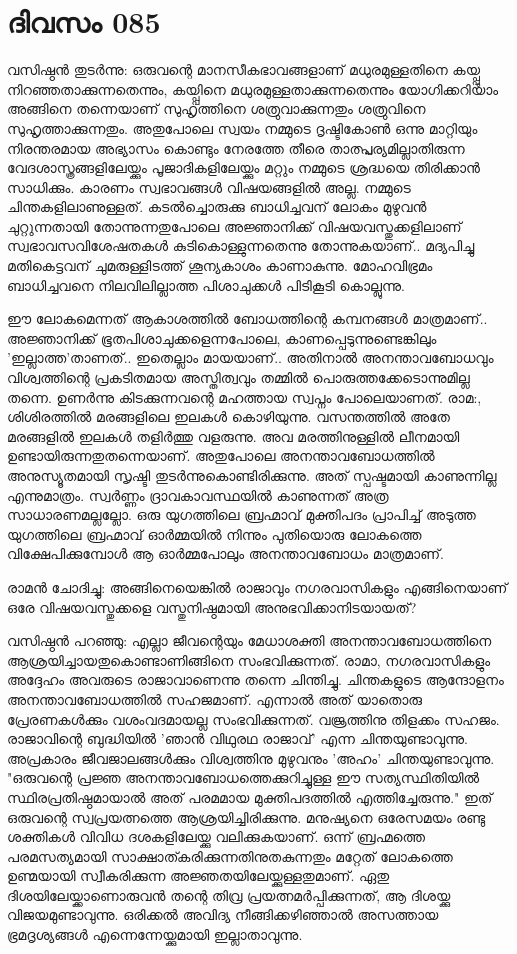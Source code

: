 \newpage
\section{ദിവസം 085}


വസിഷ്ഠന്‍ തുടര്‍ന്നു: ഒരുവന്റെ മാനസീകഭാവങ്ങളാണ്‌ മധുരമുള്ളതിനെ കയ്പ്പു നിറഞ്ഞതാക്കുന്നതെന്നും, കയ്പ്പിനെ മധുരമുള്ളതാക്കുന്നതെന്നും യോഗിക്കറിയാം അങ്ങിനെ തന്നെയാണ്‌ സുഹൃത്തിനെ ശത്രുവാക്കുന്നതും ശത്രുവിനെ സുഹൃത്താക്കുന്നതും. അതുപോലെ സ്വയം നമ്മുടെ ദൃഷ്ടികോണ്‍ ഒന്നു മാറ്റിയും നിരന്തരമായ അഭ്യാസം കൊണ്ടും നേരത്തേ തീരെ താത്പ്പര്യമില്ലാതിരുന്ന വേദശാസ്ത്രങ്ങളിലേയ്ക്കും പൂജാദികളിലേയ്ക്കും മറ്റും നമ്മുടെ ശ്രദ്ധയെ തിരിക്കാന്‍ സാധിക്കും. കാരണം സ്വഭാവങ്ങള്‍ വിഷയങ്ങളില്‍ അല്ല. നമ്മുടെ ചിന്തകളിലാണുള്ളത്‌. കടല്‍ച്ചൊരുക്കു ബാധിച്ചവന്‌ ലോകം മുഴുവന്‍ ചുറ്റുന്നതായി തോന്നുന്നതുപോലെ അജ്ഞാനിക്ക്‌ വിഷയവസ്തുക്കളിലാണ്‌ സ്വഭാവസവിശേഷതകള്‍ കുടികൊള്ളുന്നതെന്നു തോന്നുകയാണ്‌.. മദ്യപിച്ചു മതികെട്ടവന്‌ ചുമരുള്ളിടത്ത്‌ ശൂന്യകാശം കാണാകുന്നു. മോഹവിഭ്രമം ബാധിച്ചവനെ നിലവിലില്ലാത്ത പിശാചുക്കള്‍ പിടികൂടി കൊല്ലുന്നു.

ഈ ലോകമെന്നത്‌ ആകാശത്തില്‍ ബോധത്തിന്റെ കമ്പനങ്ങള്‍ മാത്രമാണ്‌.. അജ്ഞാനിക്ക്‌ ഭൂതപിശാചുക്കളെന്നപോലെ, കാണപ്പെടുന്നുണ്ടെങ്കിലും 'ഇല്ലാത്ത'താണത്‌..  ഇതെല്ലാം മായയാണ്‌.. അതിനാല്‍ അനന്താവബോധവും വിശ്വത്തിന്റെ പ്രകടിതമായ അസ്തിത്വവും തമ്മില്‍ പൊരുത്തക്കേടൊന്നുമില്ല തന്നെ. ഉണര്‍ന്നു കിടക്കുന്നവന്റെ മഹത്തായ സ്വപ്നം പോലെയാണത്‌. രാമ:, ശിശിരത്തില്‍ മരങ്ങളിലെ ഇലകള്‍ കൊഴിയുന്നു. വസന്തത്തില്‍ അതേ മരങ്ങളില്‍ ഇലകള്‍ തളിര്‍ത്തു വളരുന്നു. അവ മരത്തിനുള്ളില്‍ ലീനമായി ഉണ്ടായിരുന്നതുതന്നെയാണ്‌. അതുപോലെ അനന്താവബോധത്തില്‍ അനുസ്യൂതമായി സൃഷ്ടി തുടര്‍ന്നുകൊണ്ടിരിക്കുന്നു. അത്‌ സ്പഷ്ടമായി കാണുന്നില്ല എന്നുമാത്രം. സ്വര്‍ണ്ണം ദ്രാവകാവസ്ഥയില്‍ കാണുന്നത്‌ അത്ര സാധാരണമല്ലല്ലോ. ഒരു യുഗത്തിലെ ബ്രഹ്മാവ്‌ മുക്തിപദം പ്രാപിച്ച്‌ അടുത്ത യുഗത്തിലെ ബ്രഹ്മാവ്‌ ഓര്‍മ്മയില്‍ നിന്നും പുതിയൊരു ലോകത്തെ വിക്ഷേപിക്കുമ്പോള്‍ ആ ഓര്‍മ്മപോലും അനന്താവബോധം മാത്രമാണ്‌.

രാമന്‍ ചോദിച്ചു: അങ്ങിനെയെങ്കില്‍ രാജാവും നഗരവാസികളും എങ്ങിനെയാണ്‌ ഒരേ വിഷയവസ്തുക്കളെ വസ്തുനിഷ്ഠമായി അനുഭവിക്കാനിടയായത്‌? 

വസിഷ്ഠന്‍ പറഞ്ഞു: എല്ലാ ജീവന്റെയും മേധാശക്തി അനന്താവബോധത്തിനെ ആശ്രയിച്ചായതുകൊണ്ടാണിങ്ങിനെ സംഭവിക്കുന്നത്‌. രാമാ, നഗരവാസികളും അദ്ദേഹം അവരുടെ രാജാവാണെന്നു തന്നെ ചിന്തിച്ചു. ചിന്തകളുടെ ആന്ദോളനം അനന്താവബോധത്തില്‍ സഹജമാണ്‌. എന്നാല്‍ അത്‌ യാതൊരു പ്രേരണകള്‍ക്കും വശംവദമായല്ല സംഭവിക്കുന്നത്‌. വജ്രത്തിനു തിളക്കം സഹജം. രാജാവിന്റെ ബുദ്ധിയില്‍ 'ഞാന്‍ വിഥുരഥ രാജാവ്‌' എന്ന ചിന്തയുണ്ടാവുന്നു. അപ്രകാരം ജീവജാലങ്ങള്‍ക്കും വിശ്വത്തിനു മുഴുവനും 'അഹം' ചിന്തയുണ്ടാവുന്നു. "ഒരുവന്റെ പ്രജ്ഞ അനന്താവബോധത്തെക്കുറിച്ചുള്ള ഈ സത്യസ്ഥിതിയില്‍ സ്ഥിരപ്രതിഷ്ഠമായാല്‍ അത്‌ പരമമായ മുക്തിപദത്തില്‍ എത്തിച്ചേരുന്നു." ഇത്‌ ഒരുവന്റെ സ്വപ്രയത്നത്തെ ആശ്രയിച്ചിരിക്കുന്നു. മനുഷ്യനെ ഒരേസമയം രണ്ടു ശക്തികള്‍ വിവിധ ദശകളിലേയ്ക്കു വലിക്കുകയാണ്‌. ഒന്ന് ബ്രഹ്മത്തെ പരമസത്യമായി സാക്ഷാത്കരിക്കുന്നതിനുതകുന്നതും മറ്റേത്‌ ലോകത്തെ ഉണ്മയായി സ്വീകരിക്കുന്ന അജ്ഞതയിലേയ്ക്കുള്ളതുമാണ്‌. ഏതു ദിശയിലേയ്ക്കാണൊരുവന്‍ തന്റെ തിവ്ര പ്രയത്നമര്‍പ്പിക്കുന്നത്‌, ആ ദിശയ്ക്കു വിജയമുണ്ടാവുന്നു. ഒരിക്കല്‍ അവിദ്യ നീങ്ങിക്കഴിഞ്ഞാല്‍ അസത്തായ ഭ്രമദൃശ്യങ്ങള്‍ എന്നെന്നേയ്ക്കുമായി ഇല്ലാതാവുന്നു.

